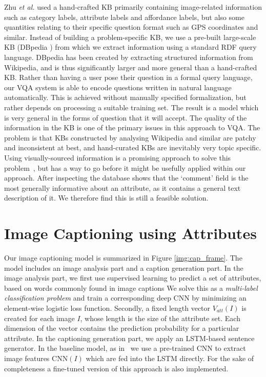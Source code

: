 \documentclass[10pt,journal,compsoc]{IEEEtran}
\newcommand{\etal}{\emph{et al.}}
\def\Att{{V_{att}}}
\def\CNN{\mbox{CNN}}
\begin{document}
Zhu \etal \cite{zhu2015building} used a hand-crafted KB primarily containing image-related information such as category labels, attribute labels and affordance labels, but also some quantities relating to their specific question format such as GPS coordinates and similar. Instead of building a problem-specific KB, we use a pre-built large-scale KB (DBpedia \cite{auer2007dbpedia}) from which we extract information using a standard RDF query language. DBpedia has been created by extracting structured information from Wikipedia, and is thus significantly larger and more general than a hand-crafted KB. Rather than having a user pose their question in a formal query language, our VQA system is able to encode questions written in natural language automatically.  This is achieved without manually specified formalization, but rather depends on processing a suitable training set. The result is a model which is very general in the forms of question that it will accept.
The quality of the information in the KB is one of the primary issues in this approach to VQA. The problem is that KBs constructed by analysing Wikipedia and similar are patchy and inconsistent at best, and hand-curated KBs are inevitably very topic specific. Using visually-sourced information is a promising approach to solve this problem~\cite{Lin_2015_CVPR, Sadeghi_2015_CVPR}, but has a way to go before it might be usefully applied within our approach. After inspecting the database shows that the ‘comment’ field is the most generally informative about an attribute, as it contains a general text description of it. We therefore find this is still a feasible solution. 
 
\section{Image Captioning using Attributes}
\label{sec:image_captioning}
Our image captioning model is summarized in Figure \ref{img:cap_frame}. The model includes an image analysis part and a caption generation part. In the image analysis part, we first use supervised learning to predict a set of attributes, based on words commonly found in image captions We solve this as a \textit{multi-label classification problem} and train a corresponding deep CNN by minimizing an element-wise logistic loss function. Secondly, a fixed length vector $\Att(I)$ is created for each image $I$, whose length is the size of the attribute set. Each dimension of the vector contains the prediction probability for a particular attribute. In the captioning generation part, we apply an LSTM-based sentence generator. In the baseline model, as in~\cite{gao2015you,ren2015image,vinyals2014show} we use a pre-trained CNN to extract image features $\CNN(I)$ which are fed into the LSTM directly. For the sake of completeness a fine-tuned version of this approach is also implemented.
\end{document}
